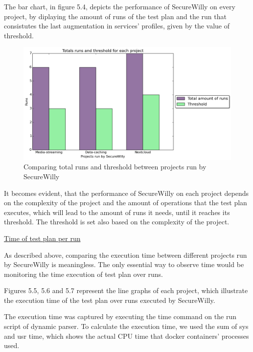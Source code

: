 The bar chart, in figure 5.4, depicts the performance of SecureWilly on every project, by diplaying the amount of runs of the test plan and the run that consistutes the last augmentation in services' profiles, given by the value of threshold.

\begin{figure}[h!]
  \centering
   \includegraphics[width=1\linewidth]{../figures/compare.png}
   \caption{Comparing total runs and threshold between projects run by SecureWilly}
\end{figure}

It becomes evident, that the performance of SecureWilly on each project depends on the complexity of the project and the amount of operations that the test plan executes, which will lead to the amount of runs it needs, until it reaches its threshold. The threshold is set also based on the complexity of the project.

\hfill\break
\underline{Time of test plan per run}
\hfill\break

As described above, comparing the execution time between different projects run by SecureWilly is meaningless. The only essential way to observe time would be monitoring the time execution of test plan over runs.

Figures 5.5, 5.6 and 5.7 represent the line graphs of each project, which illustrate the execution time of the test plan over runs executed by SecureWilly.

The execution time was captured by executing the time command on the run script of dynamic parser. To calculate the execution time, we used the sum of sys and usr time, which shows the actual CPU time that docker containers' processes used.

